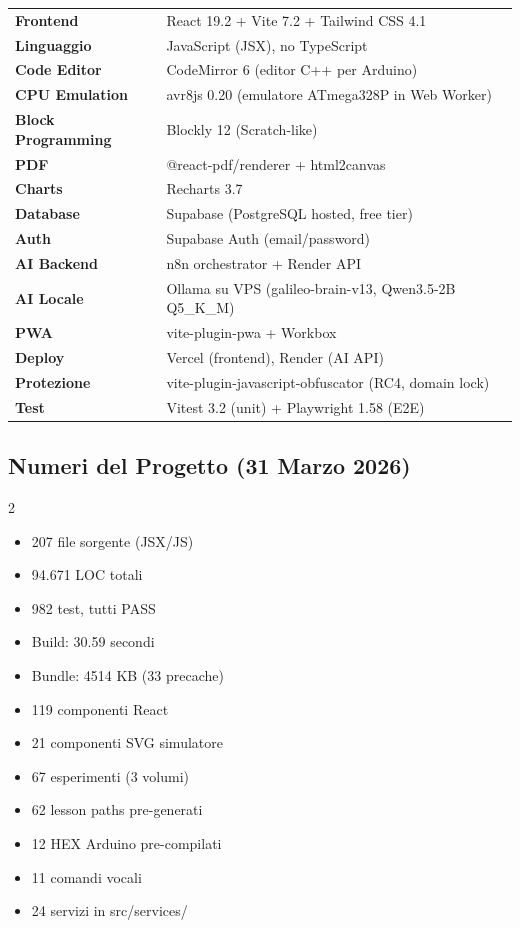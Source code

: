\documentclass[11pt,a4paper]{article}
\begin{document}
\begin{tecnico}
\begin{tabularx}{\textwidth}{lX}
\textbf{Frontend} & React 19.2 + Vite 7.2 + Tailwind CSS 4.1 \\
\textbf{Linguaggio} & JavaScript (JSX), no TypeScript \\
\textbf{Code Editor} & CodeMirror 6 (editor C++ per Arduino) \\
\textbf{CPU Emulation} & avr8js 0.20 (emulatore ATmega328P in Web Worker) \\
\textbf{Block Programming} & Blockly 12 (Scratch-like) \\
\textbf{PDF} & @react-pdf/renderer + html2canvas \\
\textbf{Charts} & Recharts 3.7 \\
\textbf{Database} & Supabase (PostgreSQL hosted, free tier) \\
\textbf{Auth} & Supabase Auth (email/password) \\
\textbf{AI Backend} & n8n orchestrator + Render API \\
\textbf{AI Locale} & Ollama su VPS (galileo-brain-v13, Qwen3.5-2B Q5\_K\_M) \\
\textbf{PWA} & vite-plugin-pwa + Workbox \\
\textbf{Deploy} & Vercel (frontend), Render (AI API) \\
\textbf{Protezione} & vite-plugin-javascript-obfuscator (RC4, domain lock) \\
\textbf{Test} & Vitest 3.2 (unit) + Playwright 1.58 (E2E) \\
\end{tabularx}
\end{tecnico}

\subsection{Numeri del Progetto (31 Marzo 2026)}

\begin{multicols}{2}
\begin{itemize}[leftmargin=1.5em]
  \item 207 file sorgente (JSX/JS)
  \item 94.671 LOC totali
  \item 982 test, tutti PASS
  \item Build: 30.59 secondi
  \item Bundle: 4514 KB (33 precache)
  \item 119 componenti React
  \item 21 componenti SVG simulatore
  \item 67 esperimenti (3 volumi)
  \item 62 lesson paths pre-generati
  \item 12 HEX Arduino pre-compilati
  \item 11 comandi vocali
  \item 24 servizi in src/services/
\end{itemize}
\end{multicols}
\end{document}
